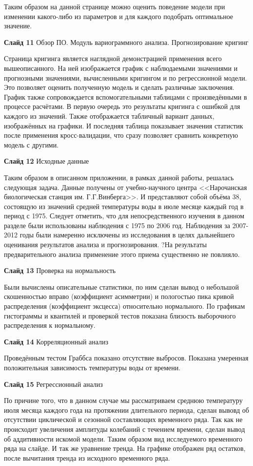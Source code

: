 \documentclass[a4paper,10pt]{report}
\begin{document}
Таким образом на данной странице можно оценить поведение модели при изменении какого-либо из параметров и для каждого подобрать оптимальное значение.

\textbf{Слайд 11} Обзор ПО. Модуль вариограммного анализа. Прогнозирование кригинг

Страница кригинга является наглядной демонстрацией применения всего вышеописанного. На ней изображается график с наблюдаемыми значениями и прогнозными значениями, вычисленными кригингом и по регрессионной модели. Это позволяет оценить полученную модель и сделать различные заключения. График также сопровождается вспомогательными таблицами с произведёнными в процессе расчётами. В первую очередь это результаты кригинга с ошибкой для каждого из значений. Также отображается табличный вариант данных, изображённых на графики. И последняя таблица показывает значения статистик после применения кросс-валидации, что сразу позволяет сравнить конкретную модель с другими.

\textbf{Слайд 12} Исходные данные

Таким образом в описанном приложении, в рамках данной работы, решалась следующая задача. Данные получены от учебно-научного центра <<Нарочанская биологическая станция им. Г.Г.Винберга>>. И представляют собой объёма 38, состоящую из значений средней температуры воды в июле месяце каждый год в период с 1975. Следует отметить, что для непосредственного изучения в данном разделе были использованы наблюдения с 1975 по 2006 год. Наблюдения за 2007-2012 годы были намеренно исключены из исследования в целях дальнейшего оценивания результатов анализа и прогнозирования. ?На результаты предварительного анализа применение этого приема существенно не повлияло.

\textbf{Слайд 13} Проверка на нормальность

Были вычислены описательные статистики, по ним сделан вывод о небольшой скошенностью вправо (коэффициент асимметрии) и пологостью пика кривой распределения (коэффициент эксцесса) относительно нормального. По графикам гистограммы и квантилей и проверкой тестов показана близость выборочного распределения к нормальному.

\textbf{Слайд 14} Корреляционный анализ

Проведённым тестом Граббса показано отсутствие выбросов. Показана умеренная положительная зависимость температуры воды от времени.

\textbf{Слайд 15} Регрессионный анализ

По причине того, что в данном случае мы рассматриваем среднюю температуру июля месяца каждого года на протяжении длительного периода, сделан вывовд об отсутствии циклической и сезонной составляющих временного ряда. Так как не происходит увеличения амплитуды колебаний с течением времени, сделан вывод об аддитивности искомой модели. Таким образом вид исследуемого временного ряда на слайде. И так же уравнение тренда. На графике отображен ряд остатков, после вычитания тренда из исходного временного ряда.
\end{document}
